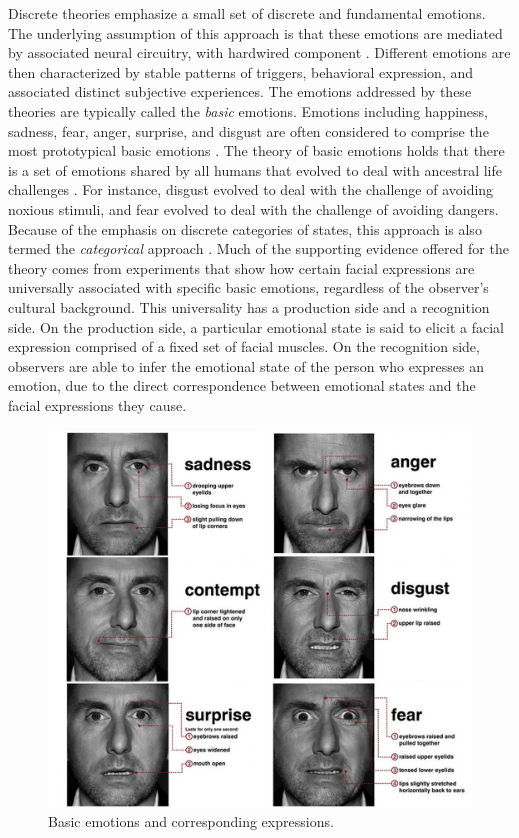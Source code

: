 \documentclass[11pt]{article}
\begin{document}
Discrete theories emphasize a small set of discrete and fundamental emotions.
The underlying assumption of this approach is that these emotions are mediated
by associated neural circuitry, with hardwired component
\cite{ekman:argument-emotions}. Different emotions are then characterized by
stable patterns of triggers, behavioral expression, and associated distinct
subjective experiences. The emotions addressed by these theories are typically
called the \textit{basic} emotions. Emotions including happiness, sadness, fear,
anger, surprise, and disgust are often considered to comprise the most
prototypical basic emotions \cite{ekman:argument-emotions}. The theory of basic
emotions holds that there is a set of emotions shared by all humans that evolved
to deal with ancestral life challenges \cite{ekman:argument-emotions}. For
instance, disgust evolved to deal with the challenge of avoiding noxious
stimuli, and fear evolved to deal with the challenge of avoiding dangers.
Because of the emphasis on discrete categories of states, this approach is also
termed the \textit{categorical} approach \cite{panskepp:affective-neuroscience}.
Much of the supporting evidence offered for the theory comes from experiments
that show how certain facial expressions are universally associated with
specific basic emotions, regardless of the observer's cultural background. This
universality has a production side and a recognition side. On the production
side, a particular emotional state is said to elicit a facial expression
comprised of a fixed set of facial muscles. On the recognition side, observers
are able to infer the emotional state of the person who expresses an emotion,
due to the direct correspondence between emotional states and the facial
expressions they cause.

\begin{figure}[tbh]
  \center
  \includegraphics[width=.9\textwidth]{figure/basic-emotions.jpg}
  \caption{Basic emotions and corresponding expressions.}
  \label{fig:basic-emotions}
\end{figure}
\end{document}
